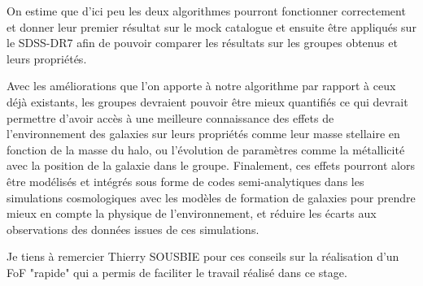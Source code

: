 On estime que d'ici peu les deux algorithmes pourront fonctionner correctement et donner leur premier résultat sur le mock
catalogue et ensuite être appliqués sur le SDSS-DR7 afin de pouvoir comparer les résultats sur les groupes obtenus et leurs
propriétés.

Avec les améliorations que l'on apporte à notre algorithme par rapport à ceux déjà existants, les groupes devraient pouvoir être
mieux quantifiés ce qui devrait permettre d'avoir accès à une meilleure connaissance des effets de l'environnement des galaxies sur
leurs propriétés comme leur masse stellaire en fonction de la masse du halo, ou l'évolution de paramètres comme la métallicité avec
la position de la galaxie dans le groupe. Finalement, ces effets pourront alors être modélisés et intégrés sous forme de codes
semi-analytiques dans les simulations cosmologiques avec les modèles de formation de galaxies pour prendre mieux en compte la
physique de l'environnement, et réduire les écarts aux observations des données issues de ces simulations.

\scriptsize
Je tiens à remercier Thierry SOUSBIE pour ces conseils sur la réalisation d'un FoF "rapide" qui a permis de faciliter le travail
réalisé dans ce stage.
\normalsize
